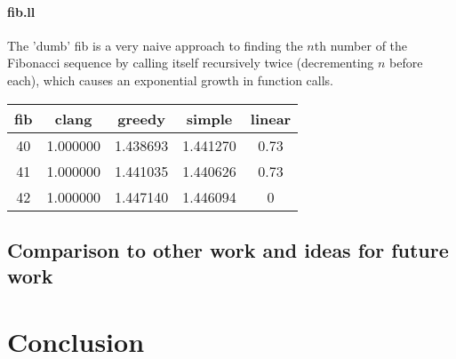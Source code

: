 \documentclass{article}
\begin{document}
\paragraph{fib.ll}
The 'dumb' fib is a very naive approach to finding the \(n\)th number of the Fibonacci sequence by calling itself recursively twice (decrementing \(n\) before each), which causes an exponential growth in function calls.
\begin{center}
\begin{tabular}{|c||c|c|c|c|} 
 \hline
 fib & clang & greedy & simple & linear \\ [0.5ex] 
 \hline
 40 & 1.000000 & 1.438693 & 1.441270 & 0.73 \\ [1ex] 
 41 & 1.000000 & 1.441035 & 1.440626 & 0.73 \\ [1ex] 
 42 & 	1.000000 & 1.447140 & 1.446094 & 0\\
 \hline
\end{tabular}
\end{center}

 





\subsection{Comparison to other work and ideas for future work}


\section{Conclusion}




\printbibliography 


\appendix

\newpage

\end{document}
